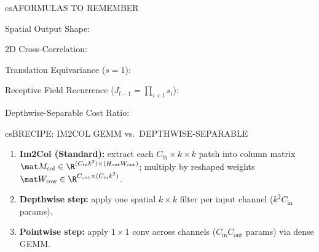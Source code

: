 \documentclass[../../../../master.tex]{subfiles}
\begin{document}
\begin{cscolumns}
\begin{cscard}{csA}{FORMULAS TO REMEMBER}
  \begin{csbul}
    \item Spatial Output Shape:
    \item 2D Cross-Correlation:
    \item Translation Equivariance ($s=1$):
    \item Receptive Field Recurrence ($J_{l-1}=\prod_{i<l}s_i$):
    \item Depthwise-Separable Cost Ratio:
  \end{csbul}
\end{cscard}

\begin{cscard}{csB}{RECIPE: IM2COL GEMM vs.\ DEPTHWISE-SEPARABLE}
  \begin{enumerate}[leftmargin=1.2em, itemsep=1pt, topsep=1pt, parsep=0pt]
    \item \textbf{Im2Col (Standard):} extract each $C_{\mathrm{in}}\times k\times k$ patch into column matrix $\mat M_{\mathrm{col}}\in\R^{(C_{\mathrm{in}}k^2)\times(H_{\mathrm{out}}W_{\mathrm{out}})}$; multiply by reshaped weights $\mat W_{\mathrm{row}}\in\R^{C_{\mathrm{out}}\times(C_{\mathrm{in}}k^2)}$.
    \item \textbf{Depthwise step:} apply one spatial $k\times k$ filter per input channel ($k^2 C_{\mathrm{in}}$ params).
    \item \textbf{Pointwise step:} apply $1\times 1$ conv across channels ($C_{\mathrm{in}}C_{\mathrm{out}}$ params) via dense GEMM.
  \end{enumerate}
\end{cscard}
\columnbreak


\end{cscolumns}
\end{document}
